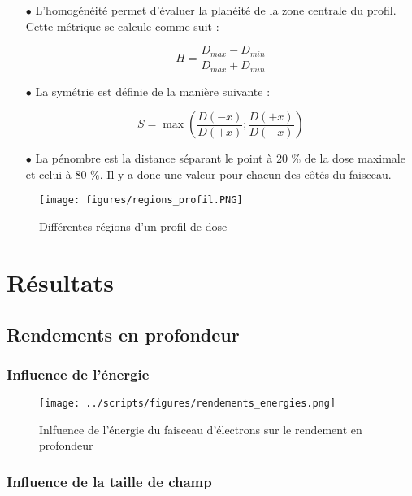 \documentclass{article}
\begin{document}
\begin{itemize}
  \item[$\bullet$] L'homogénéité permet d'évaluer la planéité de la zone centrale du profil. Cette métrique se calcule comme suit :
  
  \begin{equation}
    H = \dfrac{D_{max} - D_{min}}{D_{max} + D_{min}}
    \label{eq_homogeneite}
  \end{equation}
  
  \item[$\bullet$] La symétrie est définie de la manière suivante :
  
  \begin{equation}
    S = \max\left(\dfrac{D(-x)}{D(+x)}; \dfrac{D(+x)}{D(-x)}\right)
    \label{eq_symetrie}
  \end{equation}
  
  \item[$\bullet$] La pénombre est la distance séparant le point à 20 \% de la dose maximale et celui à 80 \%. Il y a donc une valeur pour chacun des côtés du faisceau.  
\end{itemize}

\begin{figure}[h]
  \centering
  \texttt{[image: figures/regions\_profil.PNG]}
  \caption{Différentes régions d'un profil de dose}
  \label{fig_regions_profil}
\end{figure}

\newpage
\section{Résultats}
\subsection{Rendements en profondeur}

\subsubsection{Influence de l'énergie}

\begin{figure}[h]
  \centering
  \texttt{[image: ../scripts/figures/rendements\_energies.png]}
  \caption{Inlfuence de l'énergie du faisceau d'électrons sur le rendement en profondeur}
  \label{fig_rdt_energie}
\end{figure}

\subsubsection{Influence de la taille de champ}
\end{document}
